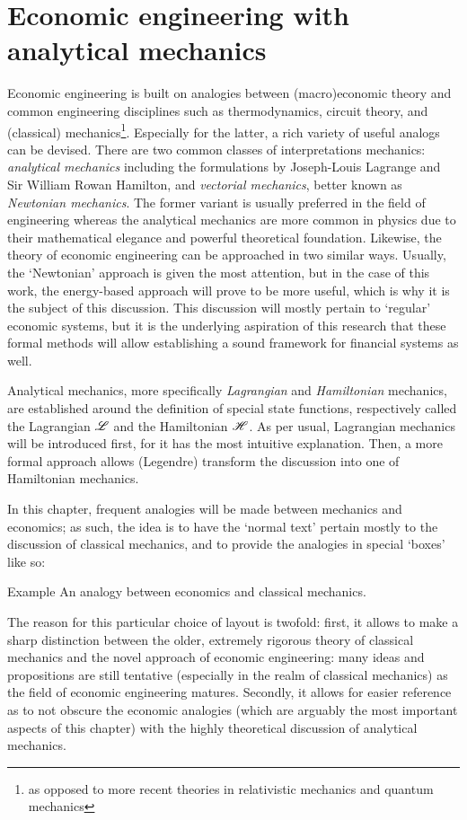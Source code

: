 \chapter{Economic engineering with analytical mechanics}
\label{chap:ee}
Economic engineering is built on analogies between (macro)economic theory and common engineering disciplines such as thermodynamics, circuit theory, and (classical) mechanics\footnote{as opposed to more recent theories in relativistic mechanics and quantum mechanics}. Especially for the latter, a rich variety of useful analogs can be devised. There are two common classes of interpretations mechanics: \emph{analytical mechanics} including the formulations by Joseph-Louis Lagrange and Sir William Rowan Hamilton, and \emph{vectorial mechanics}, better known as \emph{Newtonian mechanics}. The former variant is usually preferred in the field of engineering whereas the analytical mechanics are more common in physics due to their mathematical elegance and powerful theoretical foundation. Likewise, the theory of economic engineering can be approached in two similar ways. Usually, the `Newtonian' approach is given the most attention, but in the case of this work, the energy-based approach will prove to be more useful, which is why it is the subject of this discussion. This discussion will mostly pertain to `regular' economic systems, but it is the underlying aspiration of this research that these formal methods will allow establishing a sound framework for financial systems as well.

Analytical mechanics, more specifically \emph{Lagrangian} and \emph{Hamiltonian} mechanics, are established around the definition of special state functions, respectively called the Lagrangian \(\mathscr{L}\) and the Hamiltonian \(\mathscr{H}\). As per usual, Lagrangian mechanics will be introduced first, for it has the most intuitive explanation. Then, a more formal approach allows (Legendre) transform the discussion into one of Hamiltonian mechanics. 

In this chapter, frequent analogies will be made between mechanics and economics; as such, the idea is to have the `normal text' pertain mostly to the discussion of classical mechanics, and to provide the analogies in special `boxes' like so:
\begin{econ}{Example}
    An analogy between economics and classical mechanics.
\end{econ}
The reason for this particular choice of layout is twofold: first, it allows to make a sharp distinction between the older, extremely rigorous theory of classical mechanics and the novel approach of economic engineering: many ideas and propositions are still tentative (especially in the realm of classical mechanics) as the field of economic engineering matures. Secondly, it allows for easier reference as to not obscure the economic analogies (which are arguably the most important aspects of this chapter) with the highly theoretical discussion of analytical mechanics.
